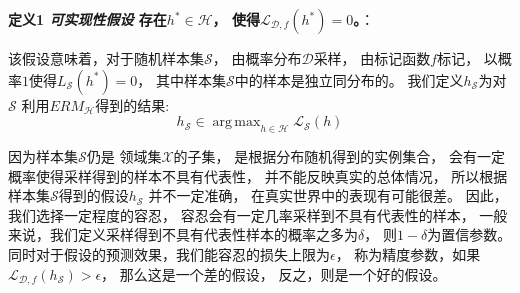\documentclass[UTF8]{ctexart}
\DeclareMathOperator*{\argmax}{arg\,max}
\begin{document}
\textbf{定义1 \textit{可实现性假设}
存在$h^*\in\mathcal{H}$，
使得$\mathcal{L}_{\mathcal{D},f}(h^*)=0$。}：


该假设意味着，对于随机样本集$\mathcal{S}$，
由概率分布$\mathcal{D}$采样，
由标记函数$f$标记，
以概率$1$使得$L_{\mathcal{S}}(h^*)=0$，
其中样本集$\mathcal{S}$中的样本是独立同分布的。
我们定义$h_{\mathcal{S}}$为对$\mathcal{S}$
利用${ERM}_{\mathcal{H}}$得到的结果:
$$
h_{\mathcal{S}}\in 
\argmax_{h\in\mathcal{H}}
\mathcal{L}_{\mathcal{S}}(h)
$$

因为样本集$\mathcal{S}$仍是
领域集$\mathcal{X}$的子集，
是根据分布随机得到的实例集合，
会有一定概率使得采样得到的样本不具有代表性，
并不能反映真实的总体情况，
所以根据样本集$\mathcal{S}$得到的假设$h_{\mathcal{S}}$
并不一定准确，
在真实世界中的表现有可能很差。
因此，我们选择一定程度的容忍，
容忍会有一定几率采样到不具有代表性的样本，
一般来说，我们定义采样得到不具有代表性样本的概率之多为$\delta$，
则$1-\delta$为置信参数。
同时对于假设的预测效果，我们能容忍的损失上限为$\epsilon$，
称为精度参数，如果
$\mathcal{L}_{\mathcal{D},f}(h_{\mathcal{S}})>\epsilon$，
那么这是一个差的假设，
反之，则是一个好的假设。
\end{document}
